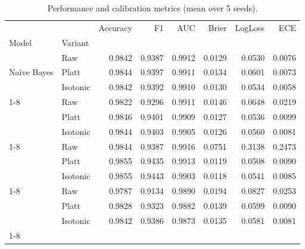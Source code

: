 \begin{table}
\caption{Performance and calibration metrics (mean over 5 seeds).}
\label{tab:results}
\begin{tabular}{llrrrrrr}
\toprule
 &  & Accuracy & F1 & AUC & Brier & LogLoss & ECE \\
Model & Variant &  &  &  &  &  &  \\
\midrule
\multirow[t]{3}{*}{Naive Bayes} & Raw & 0.9842 & 0.9387 & 0.9912 & 0.0129 & 0.0530 & 0.0076 \\
 & Platt & 0.9844 & 0.9397 & 0.9911 & 0.0134 & 0.0601 & 0.0073 \\
 & Isotonic & 0.9842 & 0.9392 & 0.9910 & 0.0130 & 0.0534 & 0.0058 \\
\cline{1-8}
\multirow[t]{3}{*}{Logistic Regression} & Raw & 0.9822 & 0.9296 & 0.9911 & 0.0146 & 0.0648 & 0.0219 \\
 & Platt & 0.9846 & 0.9401 & 0.9909 & 0.0127 & 0.0536 & 0.0099 \\
 & Isotonic & 0.9844 & 0.9403 & 0.9905 & 0.0126 & 0.0560 & 0.0081 \\
\cline{1-8}
\multirow[t]{3}{*}{Linear SVM} & Raw & 0.9844 & 0.9387 & 0.9916 & 0.0751 & 0.3138 & 0.2473 \\
 & Platt & 0.9855 & 0.9435 & 0.9913 & 0.0119 & 0.0508 & 0.0090 \\
 & Isotonic & 0.9855 & 0.9443 & 0.9903 & 0.0118 & 0.0541 & 0.0085 \\
\cline{1-8}
\multirow[t]{3}{*}{Random Forest} & Raw & 0.9787 & 0.9134 & 0.9890 & 0.0194 & 0.0827 & 0.0253 \\
 & Platt & 0.9828 & 0.9323 & 0.9882 & 0.0139 & 0.0599 & 0.0090 \\
 & Isotonic & 0.9842 & 0.9386 & 0.9873 & 0.0135 & 0.0581 & 0.0081 \\
\cline{1-8}
\bottomrule
\end{tabular}
\end{table}
